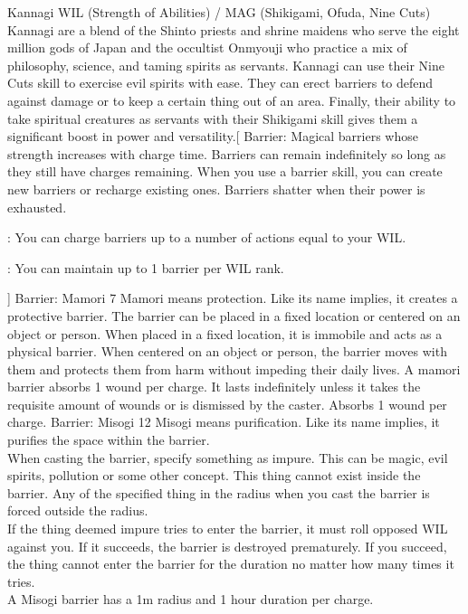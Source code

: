 ﻿\begin{path}
{Kannagi}
{WIL (Strength of Abilities) / MAG (Shikigami, Ofuda, Nine Cuts)}
{Kannagi are a blend of the Shinto priests and shrine maidens who serve the eight million gods of Japan and the occultist Onmyouji who practice a mix of philosophy, science, and taming spirits as servants.}
{Kannagi can use their Nine Cuts skill to exercise evil spirits with ease. They can erect barriers to defend against damage or to keep a certain thing out of an area. Finally, their ability to take spiritual creatures as servants with their Shikigami skill gives them a significant boost in power and versatility.}[
Barrier:
Magical barriers whose strength increases with charge time. Barriers can remain indefinitely so long as they still have charges remaining. When you use a barrier skill, you can create new barriers or recharge existing ones. Barriers shatter when their power is exhausted.
\begin{wldescription}
\item [:] You can charge barriers up to a number of actions equal to your WIL.
\item [:] You can maintain up to 1 barrier per WIL rank.
\end{wldescription}]
\skilldescription
{Barrier: Mamori}
{7}
{Mamori means protection. Like its name implies, it creates a protective barrier. The barrier can be placed in a fixed location or centered on an object or person. When placed in a fixed location, it is immobile and acts as a physical barrier. When centered on an object or person, the barrier moves with them and protects them from harm without impeding their daily lives. A mamori barrier absorbs 1 wound per charge. It lasts indefinitely unless it takes the requisite amount of wounds or is dismissed by the caster.}
{Absorbs 1 wound per charge.}
\skilldescription
{Barrier: Misogi}
{12}
{Misogi means purification. Like its name implies, it purifies the space within the barrier.
\\When casting the barrier, specify something as impure. This can be magic, evil spirits, pollution or some other concept. This thing cannot exist inside the barrier. Any of the specified thing in the radius when you cast the barrier is forced outside the radius.
\\If the thing deemed impure tries to enter the barrier, it must roll opposed WIL against you. If it succeeds, the barrier is destroyed prematurely. If you succeed, the thing cannot enter the barrier for the duration no matter how many times it tries.
\\A Misogi barrier has a 1m radius and 1 hour duration per charge.}

\end{path}
